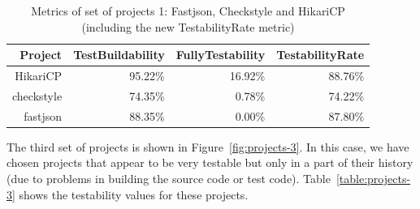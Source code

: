 \begin{table}[h!]
    \centering
    \begin{tabular}{|r|r|r|r|}
        \hline
        \textbf{Project} & \textbf{TestBuildability} & \textbf{FullyTestability} & \textbf{TestabilityRate} \\ \hline
        HikariCP         & 95.22\%                      & 16.92\%                      & 88.76\%                     \\ \hline
        checkstyle       & 74.35\%                      & 0.78\%                       & 74.22\%                     \\ \hline
        fastjson         & 88.35\%                      & 0.00\%                       & 87.80\%                     \\ \hline
        \end{tabular}
    \caption{Metrics of set of projects 1: Fastjson, Checkstyle and HikariCP (including the new TestabilityRate metric)}
    \label{table:projects-2-with-testability-rate}
\end{table}


The third set of projects is shown in Figure~\ref{fig:projects-3}. 
In this case, we have chosen projects that appear to be very testable but only in a part of their history (due to problems in building the source code or test code).
Table~\ref{table:projects-3} shows the testability values for these projects. 

